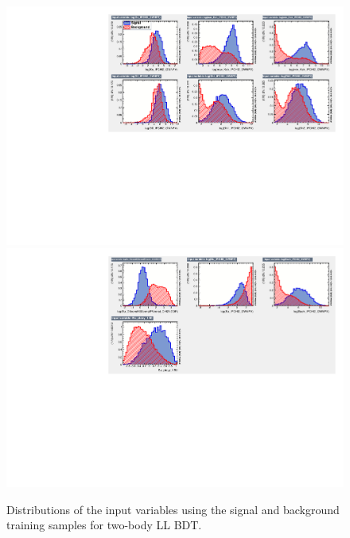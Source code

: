 \begin{figure}
\centering
\includegraphics[width=\linewidth]{figures/selection/inputvariables_KPi_LL_run1_1.pdf}
\includegraphics[width=\linewidth]{figures/selection/inputvariables_KPi_LL_run1_2.pdf}
\caption{Distributions of the input variables using the signal and background training samples for two-body LL BDT.}
\label{BDTinputdist2bodyLL}
\end{figure}

